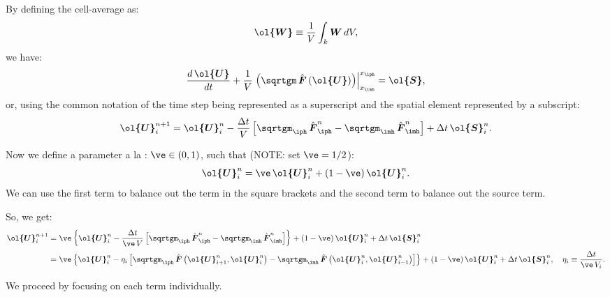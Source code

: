 \documentclass[10pt,preprint]{aastex}
\begin{document}
By defining the cell-average as:
\begin{equation*}
    \vect{\ol{W}}\equiv\f{1}{V}\int_{k}\vect{W}\,dV,
\end{equation*}
we have:
\begin{equation*}
    \f{d\,\vect{\ol{U}}}{dt}+\f{1}{V}\left.\left(\sqrtgm\,\hat{\vect{F}}\left(\vect{\ol{U}}\right)\right)\right|^{x_{\iph}}_{x_{\imh}}=\vect{\ol{S}},
\end{equation*}
or, using the common notation of the time step being represented as a superscript and the spatial element represented by a subscript:
\begin{equation*}
    \vect{\ol{U}}^{n+1}_{i}=\vect{\ol{U}}^{n}_{i}-\f{\Delta t}{V}\left[\sqrtgm_{\iph}\,\hat{\vect{F}}^{n}_{\iph}-\sqrtgm_{\imh}\,\hat{\vect{F}}^{n}_{\imh}\right]+\Delta t\,\vect{\ol{S}}^{n}_{i}.
\end{equation*}

Now we define a parameter a la \citet{ZS2011b}: $\ve\in\left(0,1\right)$, such that (NOTE: \citet{ZS2011b} set $\ve=1/2$):
\begin{equation*}
    \vect{\ol{U}}^{n}_{i}=\ve\,\vect{\ol{U}}^{n}_{i}+\left(1-\ve\right)\vect{\ol{U}}^{n}_{i}.
\end{equation*}
We can use the first term to balance out the term in the square brackets and the second term to balance out the source term.

So, we get:
\begin{align*}
    \vect{\ol{U}}^{n+1}_{i}&=\ve\left\{\vect{\ol{U}}^{n}_{i}-\f{\Delta t}{\ve\,V}\left[\sqrtgm_{\iph}\,\hat{\vect{F}}^{n}_{\iph}-\sqrtgm_{\imh}\,\hat{\vect{F}}^{n}_{\imh}\right]\right\}+\left(1-\ve\right)\vect{\ol{U}}^{n}_{i}+\Delta t\,\vect{\ol{S}}^{n}_{i}\\
    &=\ve\left\{\vect{\ol{U}}^{n}_{i}-\eta_{i}\left[\sqrtgm_{\iph}\,\hat{\vect{F}}\left(\vect{\ol{U}}^{n}_{i+1},\vect{\ol{U}}^{n}_{i}\right)-\sqrtgm_{\imh}\,\hat{\vect{F}}\left(\vect{\ol{U}}^{n}_{i},\vect{\ol{U}}^{n}_{i-1}\right)\right]\right\}+\left(1-\ve\right)\vect{\ol{U}}^{n}_{i}+\Delta t\,\vect{\ol{S}}^{n}_{i},\hspace{1em}\eta_{i}\equiv\f{\Delta t}{\ve\,V_{i}}.
\end{align*}

We proceed by focusing on each term individually.
\end{document}
